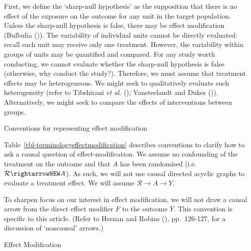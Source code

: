 \documentclass[
  single column]{article}
\begin{document}
First, we define the `sharp-null hypothesis' as the supposition that
there is no effect of the exposure on the outcome for any unit in the
target population. Unless the sharp-null hypothesis is false, there may
be effect modification (Bulbulia
()). The variability of
individual units cannot be directly evaluated: recall each unit may
receive only one treatment. However, the variability within groups of
units may be quantified and compared. For any study worth conducting, we
cannot evaluate whether the sharp-null hypothesis is false (otherwise,
why conduct the study?). Therefore, we must assume that treatment
effects may be heterogeneous. We might seek to qualitatively evaluate
such heterogeneity (refer to Tibshirani \emph{et al.}
(); Vansteelandt and Dukes
()). Alternatively, we might seek
to compare the effects of interventions between groups.

\begin{table}

\caption{\label{tbl-terminologyeffectmodification}Conventions for
representing effect modification}

\centering{

\terminologyeffectmodification

}

\end{table}%

Table~\ref{tbl-terminologyeffectmodification} describes conventions to
clarify how to ask a causal question of effect-modification. We assume
no confounding of the treatment on the outcome and that \(A\) has been
randomised (i.e.~\(\mathcal{R} \rightarrowNEW A\)). As such, we will not
use causal directed acyclic graphs to evaluate a treatment effect. We
will assume \(\mathcal{R}  \to A \to Y\).

To sharpen focus on our interest in effect modification, we will not
draw a causal arrow from the direct effect modifier \(F\) to the outcome
\(Y\). This convention is specific to this article. (Refer to Hernan and
Robins (), pp.~126-127, for a
discussion of `noncausal' arrows.)

\begin{table}

\caption{\label{tbl-terminologyeffectmodificationtypes}Effect
Modification}

\centering{

\terminologyeffectmodificationtypes

}

\end{table}%
\end{document}
